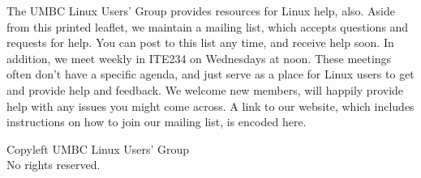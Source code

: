 \documentclass[11pt,notumble]{leaflet}
\begin{document}
The UMBC Linux Users' Group provides resources for Linux help, also. Aside from
this printed leaflet, we maintain a mailing list, which accepts questions and
requests for help. You can post to this list any time, and receive help soon. In
addition, we meet weekly in ITE234 on Wednesdays at noon. These meetings often
don't have a specific agenda, and just serve as a place for Linux users to get
and provide help and feedback. We welcome new members, will happily provide help
with any issues you might come across. A link to our website, which includes
instructions on how to join our mailing list, is encoded here.


\vfill
\begin{center} \small 
    \textcopyleft{} Copyleft \the\year{} UMBC Linux Users' Group \\
    No rights reserved.
\end{center}
\end{document}
